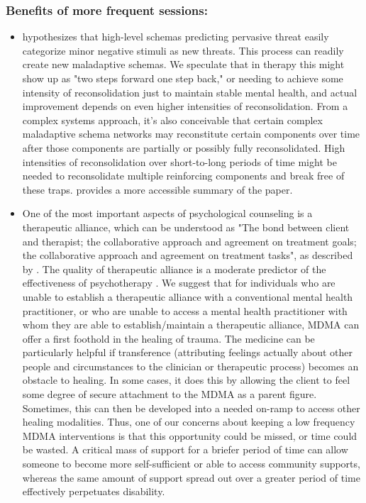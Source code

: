 \documentclass[12pt,letterpaper]{book}
\begin{document}
\subsubsection*{Benefits of more frequent sessions:}
\begin{itemize}
    \item \textcite{berghSelfEvidencing} hypothesizes that high-level schemas predicting pervasive threat easily categorize minor negative stimuli as new threats. This process can readily create new maladaptive schemas. We speculate that in therapy this might show up as "two steps forward one step back," or needing to achieve some intensity of reconsolidation just to maintain stable mental health, and actual improvement depends on even higher intensities of reconsolidation. From a complex systems approach, it's also conceivable that certain complex maladaptive schema networks may reconstitute certain components over time after those components are partially or possibly fully reconsolidated. High intensities of reconsolidation over short-to-long periods of time might be needed to reconsolidate multiple reinforcing components and break free of these traps. \textcite{alexanderPrecision} provides a more accessible summary of the paper.
    \item One of the most important aspects of psychological counseling is a therapeutic alliance, which can be understood as "The bond between client and therapist; the collaborative approach and agreement on treatment goals; the collaborative approach and agreement on treatment tasks", as described by \textcite{BRWAIdownload}. The quality of therapeutic alliance is a moderate predictor of the effectiveness of psychotherapy \cite{fluckiger2018alliance}. We suggest that for individuals who are unable to establish a therapeutic alliance with a conventional mental health practitioner, or who are unable to access a mental health practitioner with whom they are able to establish/maintain a therapeutic alliance, MDMA can offer a first foothold in the healing of trauma. The medicine can be particularly helpful if transference (attributing feelings actually about other people and circumstances to the clinician or therapeutic process) becomes an obstacle to healing. In some cases, it does this by allowing the client to feel some degree of secure attachment to the MDMA as a parent figure. Sometimes, this can then be developed into a needed on-ramp to access other healing modalities. Thus, one of our concerns about keeping a low frequency MDMA interventions is that this opportunity could be missed, or time could be wasted. A critical mass of support for a briefer period of time can allow someone to become more self-sufficient or able to access community supports, whereas the same amount of support spread out over a greater period of time effectively perpetuates disability.
\end{itemize}
\end{document}
